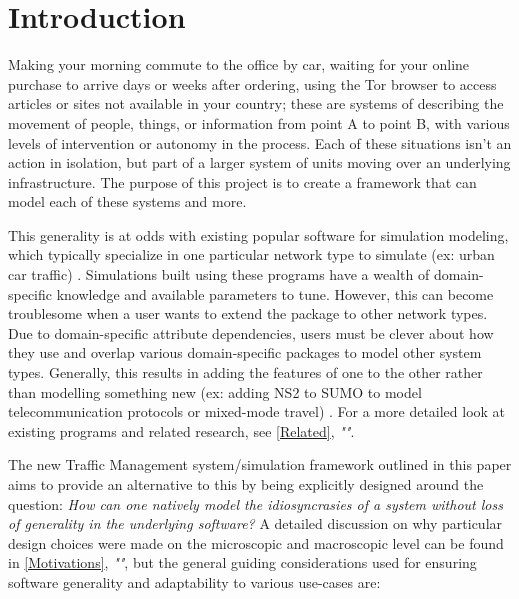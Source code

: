 \chapter{Introduction}
\label{Intro}

\par Making your morning commute to the office by car, waiting for your online purchase to arrive days or weeks after ordering, using the Tor browser to access articles or sites not available in your country; these are systems of describing the movement of people, things, or information from point A to point B, with various levels of intervention or autonomy in the process.  Each of these situations isn't an action in isolation, but part of a larger system of units moving over an underlying infrastructure.  The purpose of this project is to create a framework that can model each of these systems and more. \\

\par This generality is at odds with existing popular software for simulation modeling, which typically specialize in one particular network type to simulate (ex: urban car traffic) \cite{LWB18}.  Simulations built using these programs have a wealth of domain-specific knowledge and available parameters to tune.  However, this can become troublesome when a user wants to extend the package to other network types.  Due to  domain-specific attribute dependencies, users must be clever about how they use and overlap various domain-specific packages to model other system types.  Generally, this results in adding the features of one to the other rather than modelling something new (ex:  adding NS2 to SUMO to model telecommunication protocols or mixed-mode travel) \cite{LC08} \cite{SKMR14}.  For a more detailed look at existing programs and related research, see \autoref{Related}, \textit{""}.   \\

\par The new Traffic Management system/simulation framework outlined in this paper aims to provide an alternative to this by being explicitly designed around the question:  \textit{How can one natively model the idiosyncrasies of a system without loss of generality in the underlying software?}  A detailed discussion on why particular design choices were made on the microscopic and macroscopic level can be found in \autoref{Motivations}, \textit{""}, but the general guiding considerations used for ensuring software generality and adaptability to various use-cases are:

